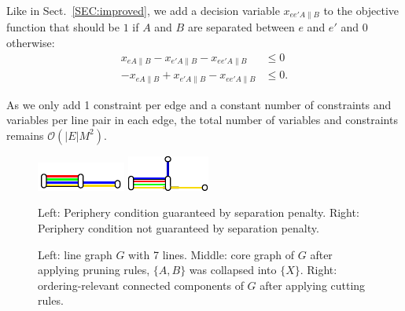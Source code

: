 \documentclass[format=acmsmall, review=false, screen=true]{acmart}
\begin{document}
Like in Sect.~\ref{SEC:improved}, we add a decision variable $x_{ee'A\|B}$ to the objective function that should be $1$ if $A$ and $B$ are separated between $e$ and $e'$ and $0$ otherwise:
\begin{align}
	x_{eA\|B} - x_{e'A\|B} - x_{ee'A\|B} &\leq 0 \\
	-x_{eA\|B} + x_{e'A\|B} - x_{ee'A\|B} &\leq 0.
\end{align}

As we only add 1 constraint per edge and a constant number of constraints and variables per line pair in each edge, the total number of variables and constraints remains $\mathcal{O}(|E|M^2)$.

\begin{figure}[b]
\centering
\begin{minipage}{.68\textwidth}
  \centering
  \includegraphics[trim={0 0.9 0 1.8},clip,width=.49\textwidth]{render_examples/periphery/periphery_example1.pdf}
  \hfill
  \includegraphics[width=.48\textwidth]{render_examples/periphery/periphery_example2.pdf}
  \caption{Left: Periphery condition guaranteed by separation penalty. Right: Periphery condition not guaranteed by separation penalty.}
  \label{FIG:periphery}
\end{minipage}
\end{figure}

\begin{figure}[t]
\centering
  
  \hfill
  
  \hfill
  
  \caption{Left: line graph $G$ with 7 lines. Middle: core graph of $G$ after applying pruning rules, $\{A, B\}$ was collapsed into $\{X\}$. Right: ordering-relevant connected components of $G$ after applying cutting rules.}
  \label{FIG:coreoptimgraph}
\end{figure}
\end{document}
